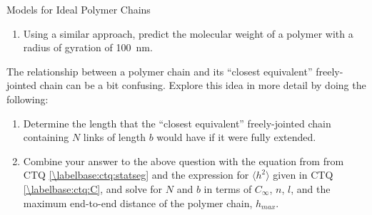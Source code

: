 \begin{activity}{Models for Ideal Polymer Chains}
\begin{exercises}
\begin{enumerate}
			\item Using a similar approach, predict the molecular weight of a polymer with a radius of gyration of 100~nm.
	
		\begin{solution}\end{solution}
		\end{enumerate}
		
	\exercise \label{\labelbase:exc:statseg} The relationship between a polymer chain and its ``closest equivalent'' freely-jointed chain can be a bit confusing.  Explore this idea in more detail by doing the following:
	
		\begin{enumerate}
		
			\item Determine the length that the ``closest equivalent'' freely-jointed chain containing $N$ links of length $b$ would have if it were fully extended. \label{\labelbase:ctq:Nb}
	
			\begin{solution}\end{solution}
			
			\item Combine your answer to the above question with the equation from from CTQ \ref{\labelbase:ctq:statseg} and the expression for $\langle h^2\rangle$ given in CTQ \ref{\labelbase:ctq:C}, and solve for $N$ and $b$ in terms of $C_\infty$, $n$, $l$, and the maximum end-to-end distance of the polymer chain, $h_{max}$.
				

\end{enumerate}
\end{exercises}
\end{activity}
